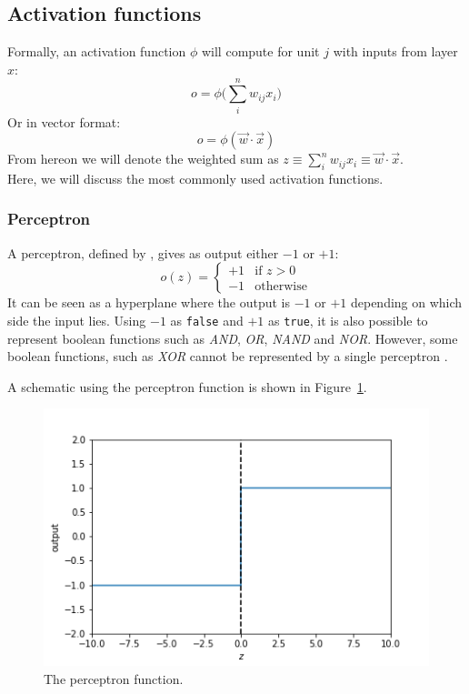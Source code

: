 \subsection{Activation functions} %
\label{sub:activation_functions}
Formally, an activation function $\phi$ will compute for unit $j$ with inputs from layer $x$:
\begin{equation}
    o = \phi\big(\sum_i^n w_{ij} x_i\big)
\end{equation}
Or in vector format:
\begin{equation}
    o = \phi(\overrightarrow{w} \cdot \overrightarrow{x})
\end{equation}
From hereon we will denote the weighted sum as $z \equiv \sum_i^n w_{ij} x_i \equiv \overrightarrow{w} \cdot \overrightarrow{x}$.\\

Here, we will discuss the most commonly used activation functions.
\subsubsection{Perceptron} %
\label{ssub:perceptron}
A perceptron, defined by \cite{Rosenblatt58}, gives as output either $-1$ or $+1$:
\begin{equation}
o(z) = \begin{cases}
+1 & \text{if $z> 0$}\\
-1 & \text{otherwise}
\end{cases}
\end{equation}
It can be seen as a hyperplane where the output is $-1$ or $+1$ depending on which side the input lies.
Using $-1$ as \texttt{false} and $+1$ as \texttt{true}, it is also possible to represent boolean functions such as \textit{AND}, \textit{OR}, \textit{NAND} and \textit{NOR}. However, some boolean functions, such as \textit{XOR} cannot be represented by a single perceptron \citep{ML}.

A schematic using the perceptron function is shown in Figure~\ref{fig:perceptron}.\\
\begin{figure}[htb]
    \centering
    \includegraphics[width=\linewidth]{images/activation_functions/perceptron.png}
    \caption[The perceptron function]{The perceptron function.}
    \label{fig:perceptron}
\end{figure}

